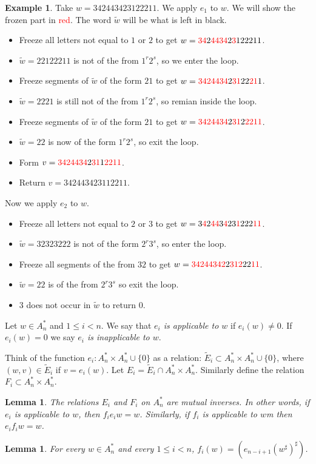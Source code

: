 \documentclass[12pt]{amsart}
\newcommand{\rc}[1]{\textcolor{red}{#1}}
\newtheorem{lemma}[theorem]{Lemma}
\theoremstyle{definition}
\theoremstyle{example}
\newtheorem{example}[theorem]{Example}
\begin{document}
\begin{example}
  Take $w=342443423122211$.
  We apply $e_1$ to $w$.
  We will show the frozen part in \rc{red}.
  The word $\tilde w$ will be what is left in black.
  \begin{itemize}
  \item Freeze all letters not equal to $1$ or $2$ to get $w=\rc{34}2\rc{4434}2\rc{3}122211$.
  \item $\tilde w=22122211$ is not of the from $1^r2^s$, so we enter the loop.
  \item Freeze segments of $\tilde w$ of the form $21$ to get $w=\rc{34}\rc{2}\rc{4434}2\rc{31}22\rc{21}1$.
  \item $\tilde w=2221$ is still not of the from $1^r2^s$, so remian inside the loop.
  \item Freeze segments of $\tilde w$ of the form $21$ to get $w=\rc{34}\rc{2}\rc{4434}2\rc{31}2\rc{2211}$.
  \item $\tilde w = 22$ is now of the form $1^r2^s$, so exit the loop.
  \item Form $v=\rc{34}\rc{2}\rc{4434}2\rc{31}1\rc{2211}$.
  \item Return $v=342443423112211$.
  \end{itemize}
  
  Now we apply $e_2$ to $w$.
  \begin{itemize}
  \item Freeze all letters not equal to $2$ or $3$ to get $w=3\rc{4}2\rc{44}3\rc{4}23\rc{1}222\rc{11}$.
  \item $\tilde w = 32323222$ is not of the form $2^r3^s$, so enter the loop.
  \item Freeze all segments of the from $32$ to get $w=\rc{342}\rc{44}\rc{342}2\rc{312}22\rc{11}$.
  \item $\tilde w = 22$ is of the from $2^r3^s$ so exit the loop.
  \item $3$ does not occur in $\tilde w$ to return $0$.
  \end{itemize}
\end{example}
Let $w\in A_n^*$ and $1\leq i<n$.
We say that \emph{$e_i$ is applicable to $w$} if $e_i(w)\neq 0$.
If $e_i(w)=0$ we say \emph{$e_i$ is inapplicable to $w$}.

Think of the function $e_i:A_n^*\times A_n^*\cup\{0\}$ as a relation: $\tilde E_i\subset A_n^*\times A_n^*\cup\{0\}$, where $(w,v)\in \tilde E_i$ if $v=e_i(w)$.
Let $E_i=\tilde E_i\cap A_n^*\times A_n^*$.
Similarly define the relation $F_i\subset A_n^*\times A_n^*$.
\begin{lemma}
  \label{lemma:e-f-inv}
  The relations $E_i$ and $F_i$ on $A_n^*$ are mutual inverses.
  In other words, if $e_i$ is applicable to $w$, then $f_ie_iw=w$.
  Similarly, if $f_i$ is applicable to $w$m then  $e_if_iw=w$.
\end{lemma}
\begin{lemma}
  For every $w\in A_n^*$ and every $1\leq i<n$, $f_i(w) = (e_{n-i+1}(w^\sharp)^\sharp)$.
\end{lemma}
\end{document}
